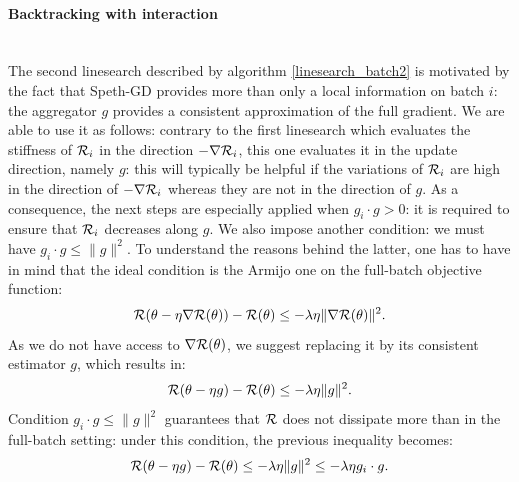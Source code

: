 \paragraph{Backtracking with interaction}
~~\\
The second linesearch described by algorithm \ref{linesearch_batch2} 
is motivated by the fact that Speth-GD provides more than only a local information on batch $i$: the aggregator $g$ provides a consistent 
approximation of the full gradient. We are able to use it as follows: 
contrary to the first linesearch which evaluates the stiffness of $\mathcal{R}_i$ in the direction $-\nabla \mathcal{R}_i$, this one evaluates it in the update direction, namely $g$: 
this will typically be helpful if the variations of $\mathcal{R}_i$ are high in the direction of $-\nabla \mathcal{R}_i$ whereas they are not in the direction of $g$. 
As a consequence, the next steps are especially applied when $g_i \cdot g>0$: it is required to ensure that $\mathcal{R}_i$ decreases along $g$. 
We also impose another condition: we must have $g_i \cdot g \leq \|g\|^2$.
To understand the reasons behind the latter, one has to have in mind that the ideal condition is the Armijo one on the full-batch objective function:
\begin{equation*}
	\mathcal{R}(\theta-\eta \nabla \mathcal{R}(\theta)) - \mathcal{R}(\theta) \leq -\lambda \eta \|\nabla \mathcal{R}(\theta)\|^2.
\end{equation*}
As we do not have access to $\nabla \mathcal{R}(\theta)$, we suggest replacing it by its consistent estimator $g$, which results in:
\begin{equation}
  \label{ok_0}
	\mathcal{R}(\theta-\eta g) - \mathcal{R}(\theta) \leq -\lambda \eta \|g\|^2.
\end{equation}   
Condition  $g_i \cdot g \leq \|g\|^2$ guarantees that $\mathcal{R}$ does not dissipate more than in the full-batch setting: under this condition, the previous inequality becomes:
\begin{equation}
  \label{ok}
	\mathcal{R}(\theta-\eta g) - \mathcal{R}(\theta) \leq -\lambda \eta \|g\|^2 \leq -\lambda \eta g_i\cdot g.
\end{equation}
\\
